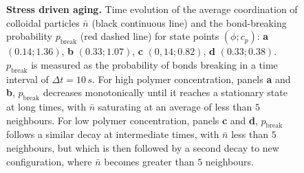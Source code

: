 \documentclass[preprint,amsmath,amssymb,superscriptaddress]{revtex4-1}
\begin{document}
\begin{figure}
 \centering
 \caption{{\bf Stress driven aging.} Time evolution of the average coordination of colloidal particles $\bar{n}$ (black continuous line) and the bond-breaking probability $p_\text{break}$ (red dashed line) for state points $(\phi;c_p)$: {\bf a} $(0.14;1.36)$, {\bf b} $(0.33;1.07)$, {\bf c} $(0,14;0.82)$, {\bf d} $(0.33;0.38)$. $p_\text{break}$ is measured as the probability of bonds breaking in a time interval of $\Delta t=10\,s$. For high polymer concentration, panels {\bf a} and {\bf b}, $p_\text{break}$ decreases monotonically until it reaches a stationary state at long times, with $\bar{n}$ saturating at an average of less than $5$ neighbours. For low polymer concentration, panels {\bf c} and {\bf d}, $p_\text{break}$ follows a similar decay at intermediate times, with $\bar{n}$ less than $5$ neighbours, but which is then followed by a second decay to new configuration, where $\bar{n}$ becomes greater than $5$ neighbours.}
 \label{fig:bond_breaking}
\end{figure}


\clearpage
\end{document}
